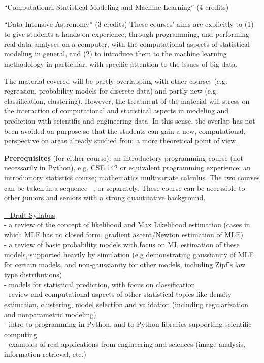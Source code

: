 \bits
\item \statcl 
``Computational Statistical Modeling and Machine Learning'' (4 credits)
\item \astrocl ``Data Intensive Astronomy'' (3 credits)
\eits
These courses' aims are explicitly to (1) to give students a hands-on experience, through programming, and performing real data analyses on a computer, with the computational aspects of 
statistical modeling in general, and (2) to introduce them to the  machine learning methodology in particular, with specific attention to the issues of big data.

The material covered will be partly overlapping with other courses
(e.g. regression, probability models for discrete data) and partly new
(e.g. classification, clustering). However, the treatment of the
material will stress on the interaction of computational and
statistical aspects in modeling and prediction with scientific and
engineering data. In this sense, the overlap has not been avoided on purpose
so that the students can gain a new, computational, perspective on areas
already studied from a more theoretical point of view. 

{\bf Prerequisites} (for either course): an introductory programming
course (not necessarily in Python), e.g. CSE 142 or equivalent
programming experience; an introductory statistics course; mathematics
multivariate calculus. The two courses can be taken in a sequence
\statcl--\astrocl, or separately. These course can be accessible to
other juniors and seniors with a strong quantitative background.

\bit
\item  \underline{\statcl~ Draft Syllabus}\\
  - a review of the concept of likelihood and Max Likelihood estimation (cases in which MLE has no closed form, gradient ascent/Newton estimation of MLE)\\
  - a review of basic probability models with focus on ML estimation of these models, supported heavily by simulation (e.g demonstrating gaussianity of MLE for certain models, and non-gaussianity for other models, including Zipf's law type distributions)\\
  - models for statistical prediction, with focus on classification\\
  - review and computational aspects of other statistical topics like
  density estimation, clustering, model selection and validation
  (including regularization and  nonparametric modeling)\\
  - intro to programming in Python, and to Python libraries supporting scientific computing\\
  - examples of real applications from engineering and sciences (image
  analysis, information retrieval, etc.)

